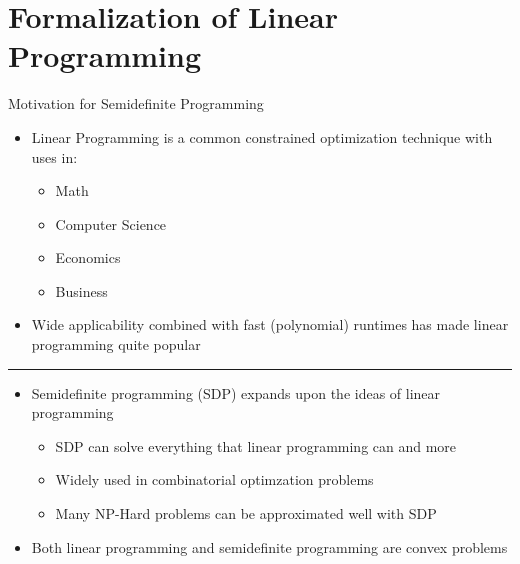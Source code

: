 \documentclass[
	11pt, %
]{beamer}
\begin{document}
\section{Formalization of Linear Programming}
\begin{frame}[label={sec:org0f20b1e}]{Motivation for Semidefinite Programming}
\begin{itemize}
\item Linear Programming is a common constrained optimization technique with uses in:
\begin{itemize}
\item Math
\item Computer Science
\item Economics
\item Business
\end{itemize}
\item Wide applicability combined with fast (polynomial) runtimes has made linear programming quite popular
\end{itemize}
\pause
\noindent\rule{\textwidth}{0.5pt}
\begin{itemize}
\item Semidefinite programming (SDP) expands upon the ideas of linear programming
\begin{itemize}
\item SDP can solve everything that linear programming can and more
\item Widely used in combinatorial optimzation problems
\item Many NP-Hard problems can be approximated well with SDP
\end{itemize}
\item Both linear programming and semidefinite programming are convex problems
\end{itemize}
\end{frame}
\end{document}
